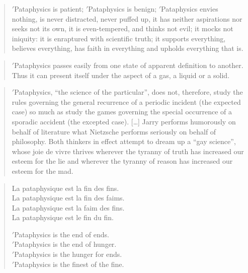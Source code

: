 \begin{quotation}
  $'$Pataphysics is patient; $'$Pataphysics is benign; $'$Pataphysics envies nothing, is never distracted, never puffed up, it has neither aspirations nor seeks not its own, it is even-tempered, and thinks not evil; it mocks not iniquity: it is enraptured with scientific truth; it supports everything, believes everything, has faith in everything and upholds everything that is. 
\end{quotation}

\begin{quotation}
  $'$Pataphysics passes easily from one state of apparent definition to another. Thus it can present itself under the aspect of a gas, a liquid or a solid. 
\end{quotation}

\begin{quotation}
  $'$Pataphysics, ``the science of the particular'', does not, therefore, study the rules governing the general recurrence of a periodic incident (the expected case) so much as study the games governing the special occurrence of a sporadic accident (the excepted case). […] Jarry performs humorously on behalf of literature what Nietzsche performs seriously on behalf of philosophy. Both thinkers in effect attempt to dream up a ``gay science'', whose joie de vivre thrives wherever the tyranny of truth has increased our esteem for the lie and wherever the tyranny of reason has increased our esteem for the mad. 
\end{quotation}

\begin{quotation}
  \begin{multicols}{2}
  La pataphysique est la fin des fins.\\
  La pataphysique est la fin des faims.\\
  La pataphysique est la faim des fins.\\
  La pataphysique est le fin du fin.
  \par \vfill \columnbreak{}
  \begin{flushright}
  $'$Pataphysics is the end of ends.\\
  $'$Pataphysics is the end of hunger.\\
  $'$Pataphysics is the hunger for ends.\\
  $'$Pataphysics is the finest of the fine.
  \end{flushright}
  \end{multicols}
\end{quotation}

